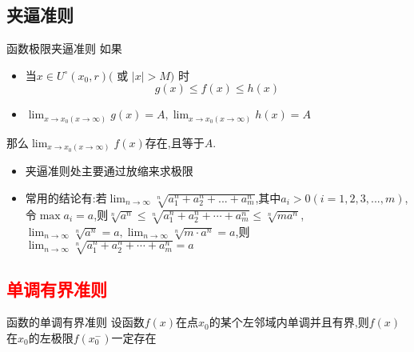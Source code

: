 \documentclass[12pt, a4paper, oneside, UTF8]{ctexbook}
\begin{document}
\begin{sloppypar}
    \subsection{夹逼准则}
    \begin{defn}{函数极限夹逼准则}{}
        如果
        \begin{itemize}
            \item 当$x\in U^{\circ}(x_{0},r)($ 或 $|x|>M)$ 时
                  $$
                      g(x)\leqslant f(x) \leqslant h(x)
                  $$
            \item $\lim_{x\to x_0(x\to\infty)}g(x)=A,\lim_{x\to x_0(x\to\infty)}h(x)=A$
        \end{itemize}
        那么$\lim_{x\to x_0(x\to\infty)}f(x)$存在,且等于$A$.
    \end{defn}
    \begin{itemize}
        \item 夹逼准则处主要通过放缩来求极限
        \item 常用的结论有:若$\lim _{n \to \infty} \sqrt[n]{a_1^n+a_2^n+...+a_m^n}$,其中$a_i >0(i=1,2,3,...,m)$,令$\max{a_i}=a$,则$\sqrt[n]{a^n}\leqslant\sqrt[n]{a_1^n+a_2^n+\cdots+a_m^n}\leqslant\sqrt[n]{ma^n}$,\\$\lim_{n\to\infty}\sqrt[n]{a^n}=a,\lim_{n\to\infty}\sqrt[n]{m\cdot a^n}=a$,则$\operatorname*{lim}_{n\to\infty}\sqrt[n]{a_1^n+a_2^n+\cdots+a_m^n}=a$
    \end{itemize}
    \subsection{\textcolor{red}{单调有界准则}}
    \begin{defn}{函数的单调有界准则}{}
        设函数$f(x)$在点$x_0$的某个左邻域内单调并且有界,则$f(x)$在$x_0$的左极限$f(x_0^-)$一定存在
    \end{defn}


\end{sloppypar}
\end{document}
